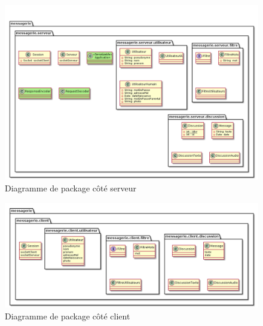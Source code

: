 	\begin{figure}[H]
	\centerline{\includegraphics[width=16.5cm]{img/packageServeurV2.png}}
		\caption{Diagramme de package côté serveur}
	\end{figure}

	\begin{figure}[H]
	\centerline{\includegraphics[width=16.5cm]{img/packageClient.png}}
	\caption{Diagramme de package côté client}
	\end{figure}